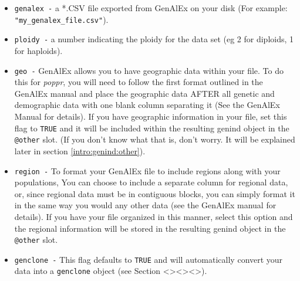 \documentclass[letterpaper]{article}\usepackage[]{graphicx}\usepackage[]{color}
\begin{document}
\begin{itemize}
  \item \texttt{genalex -} a *.CSV file exported from GenAlEx on your disk (For example: \texttt{"my\_genalex\_file.csv"}).
  \item \texttt{ploidy -} a number indicating the ploidy for the data set (eg 2 for diploids, 1 for haploids).
  \item \texttt{geo -} GenAlEx allows you to have geographic data within your file. To do this for \textit{poppr}, you will need to follow the first format outlined in the GenAlEx manual and place the geographic data AFTER all genetic and demographic data with one blank column separating it (See the GenAlEx Manual for details). If you have geographic information in your file, set this flag to \texttt{TRUE} and it will be included within the resulting genind object in the \texttt{@other} slot. (If you don't know what that is, don't worry. It will be explained later in section \ref{intro:genind:other}).
  \item \texttt{region -} To format your GenAlEx file to include regions along with your populations, You can choose to include a separate column for regional data, or, since regional data must be in contiguous blocks, you can simply format it in the same way you would any other data (see the GenAlEx manual for details). If you have your file organized in this manner, select this option and the regional information will be stored in the resulting genind object in the \texttt{@other} slot.
  \item \texttt{genclone -} This flag defaults to \texttt{TRUE} and will automatically convert your data into a \texttt{genclone} object (see Section <><><>).
\end{itemize}

\begin{center}
\end{center}
\end{document}
